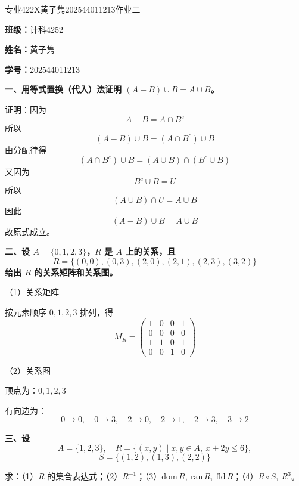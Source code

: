\documentclass[12pt,a4paper]{ctexart}
\begin{document}
\begin{center}
    \heiti 专业422X黄子隽202544011213作业二
\end{center}

\vspace{1em}

\noindent\textbf{班级：}计科4252

\noindent\textbf{姓名：}黄子隽

\noindent\textbf{学号：}202544011213

\vspace{1em}

\noindent\textbf{一、用等式置换（代入）法证明 $(A-B)\cup B=A\cup B$。}

\vspace{0.5em}

\noindent
证明：因为
\[
A-B=A\cap B^c
\]
所以
\[
(A-B)\cup B=(A\cap B^c)\cup B
\]
由分配律得
\[
(A\cap B^c)\cup B=(A\cup B)\cap(B^c\cup B)
\]
又因为
\[
B^c\cup B=U
\]
所以
\[
(A\cup B)\cap U=A\cup B
\]
因此
\[
(A-B)\cup B=A\cup B
\]
故原式成立。

\vspace{1em}

\noindent\textbf{二、设 $A=\{0,1,2,3\}$，$R$ 是 $A$ 上的关系，且}
\[
R=\{(0,0),(0,3),(2,0),(2,1),(2,3),(3,2)\}
\]
\noindent\textbf{给出 $R$ 的关系矩阵和关系图。}

\vspace{0.5em}

\noindent
（1）关系矩阵

按元素顺序 $0,1,2,3$ 排列，得
\[
M_R=
\begin{pmatrix}
1 & 0 & 0 & 1\\
0 & 0 & 0 & 0\\
1 & 1 & 0 & 1\\
0 & 0 & 1 & 0
\end{pmatrix}
\]

\vspace{0.5em}

\noindent
（2）关系图

顶点为：$0,1,2,3$

有向边为：
\[
0\to0,\quad 0\to3,\quad 2\to0,\quad 2\to1,\quad 2\to3,\quad 3\to2
\]

\vspace{1em}

\noindent\textbf{三、设}
\[
A=\{1,2,3\},\quad
R=\{(x,y)\mid x,y\in A,\ x+2y\le 6\},
\]
\[
S=\{(1,2),(1,3),(2,2)\}
\]

\noindent
求：（1）$R$ 的集合表达式；（2）$R^{-1}$；（3）$\mathrm{dom}\,R,\ \mathrm{ran}\,R,\ \mathrm{fld}\,R$；（4）$R\circ S,\ R^3$。
\end{document}
